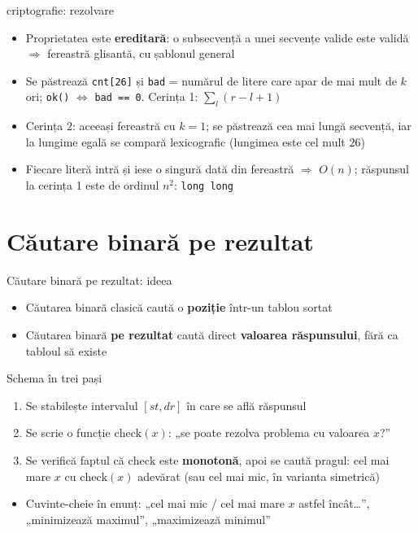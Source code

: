 \documentclass[8pt,mathserif]{beamer}
\begin{document}
\begin{frame}{criptografie: rezolvare}
  \large
  \begin{itemize}
    \item Proprietatea este \textbf{ereditară}: o subsecvență a unei secvențe valide este validă $\Rightarrow$ fereastră glisantă, cu șablonul general
    \item Se păstrează \texttt{cnt[26]} și \texttt{bad} = numărul de litere care apar de mai mult de $k$ ori; \texttt{ok()} $\Longleftrightarrow$ \texttt{bad == 0}. Cerința 1: $\sum_l (r - l + 1)$
    \item Cerința 2: aceeași fereastră cu $k = 1$; se păstrează cea mai lungă secvență, iar la lungime egală se compară lexicografic (lungimea este cel mult $26$)
    \item Fiecare literă intră și iese o singură dată din fereastră $\Rightarrow$ $O(n)$; răspunsul la cerința 1 este de ordinul $n^2$: \texttt{long long}
  \end{itemize}
\end{frame}

\section{Căutare binară pe rezultat}

\begin{frame}{Căutare binară pe rezultat: ideea}
  \begin{itemize}
    \item Căutarea binară clasică caută o \textbf{poziție} într-un tablou sortat
    \item Căutarea binară \textbf{pe rezultat} caută direct \textbf{valoarea răspunsului}, fără ca tabloul să existe
  \end{itemize}
  \begin{block}{Schema în trei pași}
    \begin{enumerate}
      \item Se stabilește intervalul $[st, dr]$ în care se află răspunsul
      \item Se scrie o funcție $\mathrm{check}(x)$: „se poate rezolva problema cu valoarea $x$?”
      \item Se verifică faptul că $\mathrm{check}$ este \textbf{monotonă}, apoi se caută pragul: cel mai mare $x$ cu $\mathrm{check}(x)$ adevărat (sau cel mai mic, în varianta simetrică)
    \end{enumerate}
  \end{block}
  \begin{itemize}
    \item Cuvinte-cheie în enunț: „cel mai mic / cel mai mare $x$ astfel încât\ldots”, „minimizează maximul”, „maximizează minimul”
  \end{itemize}
\end{frame}
\end{document}
